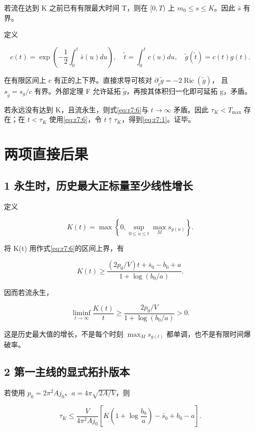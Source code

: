 \documentclass[UTF8,11pt,fontset=none]{ctexart}
\begin{document}
若流在达到 K 之前已有有限最大时间 T，则在 \([0,T)\) 上 \(m_0\le s\le K\)。因此 \(\bar s\) 有界。

定义

\[
 c(t)=\exp\left(-\frac12\int_0^t\bar s(u)du\right),
 \quad \widetilde t=\int_0^t c(u)du,
 \quad \widetilde g(\widetilde t)=c(t)g(t).
\]

在有限区间上 c 有正的上下界。直接求导可核对 \(\partial_{\widetilde t}\widetilde g=-2\operatorname{Ric}(\widetilde g)\)， 且 \(s_{\widetilde g}=s_g/c\) 有界。外部定理 F 允许延拓 \(\widetilde g\)，再按其体积归一化即可延拓 g，矛盾。

若永远没有达到 K，且流永生，则式\eqref{eq:r7:6}与 \(t\to\infty\) 矛盾。因此 \(\tau_K<T_{\max}\) 存在；在 \(t<\tau_K\) 使用\eqref{eq:r7:6}，令 \(t\uparrow\tau_K\)，得到\eqref{eq:r7:1}。证毕。

\section{两项直接后果}\label{ch7:ux4e24ux9879ux76f4ux63a5ux540eux679c}

\subsection{1 永生时，历史最大正标量至少线性增长}\label{ch7:ux6c38ux751fux65f6ux5386ux53f2ux6700ux5927ux6b63ux6807ux91cfux81f3ux5c11ux7ebfux6027ux589eux957f}

定义

\[
 K(t)=\max\left\{0,\sup_{0\le u\le t}\max_Ms_{g(u)}\right\}.
\]

将 K(t) 用作式\eqref{eq:r7:6}的区间上界，有

\[
 \boxed{
 K(t)\ge
 \frac{(2p_0/V)t+\bar s_0-b_0+a}
 {1+\log(b_0/a)}.
 }
\tag{7.7}\label{eq:r7:7}
\]

因而若流永生，

\[
 \liminf_{t\to\infty}\frac{K(t)}t
 \ge\frac{2p_0/V}{1+\log(b_0/a)}>0.
\]

这是历史最大值的增长，不是每个时刻 \(\max_Ms_{g(t)}\) 都单调，也不是有限时间爆破率。

\subsection{2 第一主线的显式拓扑版本}\label{ch7:ux7b2cux4e00ux4e3bux7ebfux7684ux663eux5f0fux62d3ux6251ux7248ux672c}

若使用 \(p_0=2\pi^2Aj_0\)、\(a=4\pi\sqrt{2A/V}\)，则

\[
 \boxed{
 \tau_K\le\frac{V}{4\pi^2Aj_0}
 \left[K\left(1+\log\frac{b_0}{a}\right)-\bar s_0+b_0-a\right].
 }
\tag{7.8}\label{eq:r7:8}
\]
\end{document}

